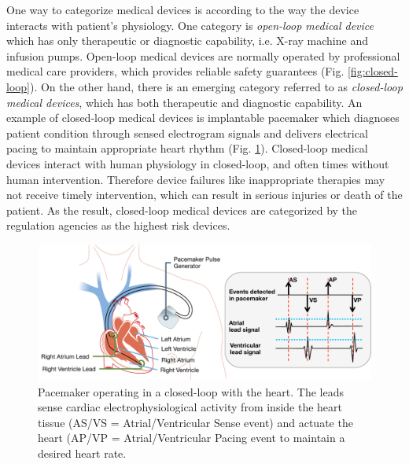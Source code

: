 \documentclass[a4paper,11pt]{article}
\begin{document}
One way to categorize medical devices is according to the way the device interacts with patient's physiology.
One category is \emph{open-loop medical device} which has only therapeutic or diagnostic capability, i.e. X-ray machine and infusion pumps. 
Open-loop medical devices are normally operated by professional medical care providers, which provides reliable safety guarantees (Fig. \ref{fig:closed-loop}).
On the other hand, there is an emerging category referred to as \emph{closed-loop medical devices}, which has both therapeutic and diagnostic capability.
An example of closed-loop medical devices is implantable pacemaker which diagnoses patient condition through sensed electrogram signals and delivers electrical pacing to maintain appropriate heart rhythm (Fig. \ref{fig:pacemaker}). 
Closed-loop medical devices interact with human physiology in closed-loop, and often times without human intervention.
Therefore device failures like inappropriate therapies may not receive timely intervention, which can result in serious injuries or death of the patient.
As the result, closed-loop medical devices are categorized by the regulation agencies as the highest risk devices.
\begin{figure}[b]
	\centering
	\includegraphics[scale=0.35]{figs/fig1pacemaker.pdf}
	\caption{\small Pacemaker operating in a closed-loop with the heart. The leads sense cardiac electrophysiological activity from inside the heart tissue (AS/VS = Atrial/Ventricular Sense event) and actuate the heart (AP/VP = Atrial/Ventricular Pacing event to maintain a desired heart rate.}
	\label{fig:pacemaker}
\end{figure}
\end{document}

